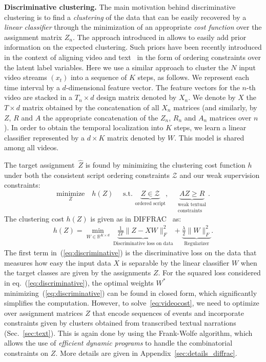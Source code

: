 \documentclass[10pt,twocolumn,letterpaper]{article}
\begin{document}
%
\textbf{Discriminative clustering.}
The main motivation behind discriminative clustering is to find a \emph{clustering} of the data that can be easily recovered by a \emph{linear classifier} through the minimization of an appropriate \emph{cost function} over the assignment matrix $Z_n$.
The approach introduced in \cite{Bach07diffrac} allows to easily add prior information on the expected clustering.
Such priors have been recently introduced in the context of aligning video and text~\cite{Bojanowski14weakly, Bojanowski15weakly} in the form of ordering constraints over the latent label variables.
Here we use a similar approach to cluster the $N$ input video streams $(x_t)$ into a sequence of $K$ steps, as follows.
We represent each time interval by a $d$-dimensional feature vector. 
The feature vectors for the $n$-th video are stacked in a $T_n\times d$ design matrix denoted by $X_n$. 
We denote by $X$ the $T \times d$ matrix obtained by the concatenation of all $X_n$ matrices
(and similarly, by $Z$, $R$ and $A$ the appropriate concatenation of the $Z_n$, $R_n$ and $A_n$ matrices over $n$). 
%
In order to obtain the temporal localization into $K$ steps, we learn a linear classifier represented by a $d \times K$ matrix denoted by $W$.
This model is shared among all videos. 
%
%

The target assignment~$\hat{Z}$ is found by minimizing the clustering cost function $h$ under 
both the consistent script ordering constraints $\mathcal{Z}$ and
our weak supervision constraints:
%
\begin{equation}
\underset{Z}{\text{minimize}} \quad h(Z) \quad  \text{ s.t. }  \underbrace{Z \in \mathcal{Z}}_{\text{ordered script}}, \quad
\underbrace{AZ \geq R}_{\substack{\text{weak textual}\\ \text{constraints}} }.
\label{eq:videocost}
\end{equation}
The clustering cost $h(Z)$ is given as in DIFFRAC~\cite{Bach07diffrac} as:
\begin{align}
%
    h(Z) = \min_{W \in \mathbb{R}^{K \times d}} \ \underbrace{\frac{1}{2T} \|Z - X W\|_F^2}_\text{Discriminative loss on data} + \underbrace{\frac{\lambda}{2} \|W\|_F^2}_\text{Regularizer}. 
    \label{eq:discriminative}
\end{align}
The first term in~(\ref{eq:discriminative}) is the discriminative loss on the data that measures how easy the input data $X$ is separable by the linear classifier $W$ when the target classes are given by the assignments $Z$.  
For the squared loss considered in eq.~(\ref{eq:discriminative}), the optimal weights $W^*$ minimizing~(\ref{eq:discriminative}) can be found in closed form, 
%
which significantly simplifies the computation. 
However, to solve~\eqref{eq:videocost}, we need to optimize over assignment matrices $Z$ that encode sequences of events and incorporate constraints given by clusters obtained from transcribed textual narrations (Sec.~\ref{sec:text}). 
This is again done by using the Frank-Wolfe algorithm, which allows the use of \emph{efficient dynamic programs} 
to handle the combinatorial constraints on $Z$.
More details are given in Appendix~\ref{sec:details_diffrac}.
%
%
%
%
%
%
%
%
%
%
%
%
%
%
%
%
%
%
%
%
%
%
%
%
%
%
%
%
%
%
%
%
%
%
%
%
%
%
%
%
%
%
%
%
%
%
%
%
%
%
%
%
%
%
%
%
%
%
%
%
%
\end{document}
